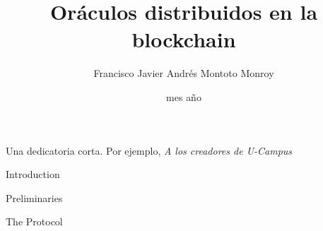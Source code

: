 \documentclass[upright, contnum]{umemoria}
\author{Francisco Javier Andr\'es Montoto Monroy}
\title{Or\'aculos distribuidos en la blockchain}
\date{mes {a\~no}}
\begin{document}
\frontmatter
\maketitle

\begin{abstract}
	
\end{abstract}

\begin{dedicatoria} %
	Una dedicatoria corta. Por ejemplo, \emph{A los creadores de U-Campus}
\end{dedicatoria}

\begin{thanks} %
	\lipsum[1-2]
\end{thanks}
\cleardoublepage
{}
\tableofcontents
\listoftables %
\listoffigures %

\mainmatter

\begin{my_section}{Introduction}
	
\end{my_section}

\begin{my_section}{Preliminaries}
	
	
	
	
	
\end{my_section}

\begin{my_section}{The Protocol}
	
\end{my_section}





\printbibliography
\end{document}
